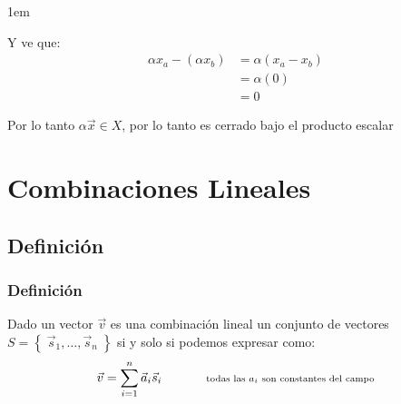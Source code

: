 \documentclass[12pt, fleqn]{report}                             %
\newenvironment{SmallIndentation}[1][0.75em]                    %
        {\begin{adjustwidth}{#1}{}\begin{footnotesize}}             %
        {\end{footnotesize}\end{adjustwidth}}                       %
\DeclareMathOperator \Space     {\quad}                         %
\DeclareMathOperator \MegaSpace {\quad \quad}                   %
\newcommand \Remember[1]    {\Space\text{\scriptsize{#1}}}      %
\theoremstyle{break}                                            %
\newcommand{\Set}[1]            {\left\{ \; #1 \; \right\}}     %
\begin{document}
\begin{itemize}
\begin{SmallIndentation}[1em]
\begin{itemize}
                                Y ve que:
                                \begin{align*}
                                    \alpha x_a - (\alpha x_b)
                                        &= \alpha (x_a - x_b)               \\
                                        &= \alpha (0)                       \\
                                        &= 0
                                \end{align*}

                                Por lo tanto $\alpha \vec x \in X$, por lo tanto es cerrado bajo el producto escalar

                        \end{itemize}

                    \end{SmallIndentation}

            \end{itemize}



    \chapter{Combinaciones Lineales}

        \clearpage
        \section{Definición}

            \subsection{Definición}

                Dado un vector $\vec v$ es una combinación lineal un conjunto de
                vectores $S = \Set{\vec s_1, \dots, \vec s_n}$ si y solo si
                podemos expresar como:
                \begin{equation*}
                    \vec v = \sum_{i = 1}^n \vec a_i \vec s_i
                    \MegaSpace
                    \Remember{todas las $a_i$ son constantes del campo}
                \end{equation*}
\end{document}
